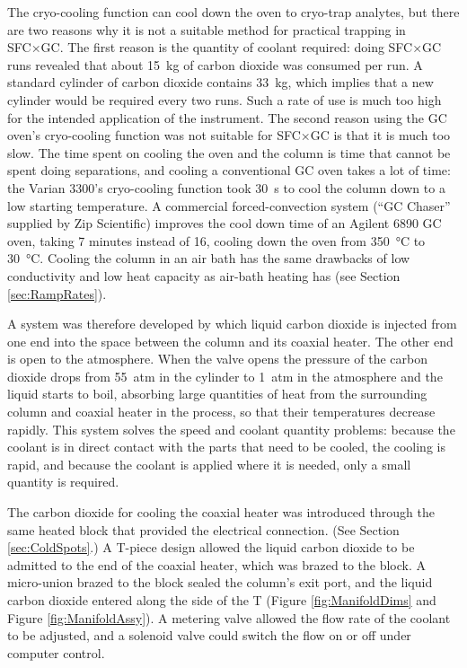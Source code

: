 The cryo-cooling function can cool down the oven to cryo-trap analytes, but
there are two reasons why it is not a suitable method for practical trapping in
SFC×GC. The first reason is the quantity of coolant required: doing SFC×GC runs
revealed that about \SI{15}{\kilogram} of carbon dioxide was consumed per run. A
standard cylinder of carbon dioxide contains \SI{33}{\kilogram}, which implies
that a new cylinder would be required every two runs. Such a rate of use is much
too high for the intended application of the instrument. The second reason using
the GC oven's cryo-cooling function was not suitable for SFC×GC is that it is
much too slow. The time spent on cooling the oven and the column is time that
cannot be spent doing separations, and cooling a conventional GC oven takes a
lot of time: the Varian 3300's cryo-cooling function took \SI{30}{\second} to
cool the column down to a low starting temperature. A commercial
forced-convection system (``GC Chaser'' supplied by Zip Scientific) improves the
cool down time of an Agilent 6890 GC oven, taking 7 minutes instead of 16,
cooling down the oven from \SI{350}{\celsius} to \SI{30}{\celsius}. Cooling the
column in an air bath has the same drawbacks of low conductivity and low heat
capacity as air-bath heating has (see Section \ref{sec:RampRates}).


A system was therefore developed by which liquid carbon dioxide is injected from
one end into the space between the column and its coaxial heater. The other end
is open to the atmosphere. When the valve opens the pressure of the carbon
dioxide drops from \SI{55}{atm} in the cylinder to \SI{1}{atm} in the atmosphere
and the liquid starts to boil, absorbing large quantities of heat from the
surrounding column and coaxial heater in the process, so that their temperatures
decrease rapidly. This system solves the speed and coolant quantity problems:
because the coolant is in direct contact with the parts that need to be cooled,
the cooling is rapid, and because the coolant is applied where it is needed,
only a small quantity is required.

The carbon dioxide for cooling the coaxial heater was introduced through the
same heated block that provided the electrical connection. (See Section
\ref{sec:ColdSpots}.) A T-piece design allowed the liquid carbon dioxide to be
admitted to the end of the coaxial heater, which was brazed to the block. A
micro-union brazed to the block sealed the column's exit port, and the liquid
carbon dioxide entered along the side of the T (Figure \ref{fig:ManifoldDims}
and Figure \ref{fig:ManifoldAssy}). A metering valve allowed the flow rate of
the coolant to be adjusted, and a solenoid valve could switch the flow on or off
under computer control.

